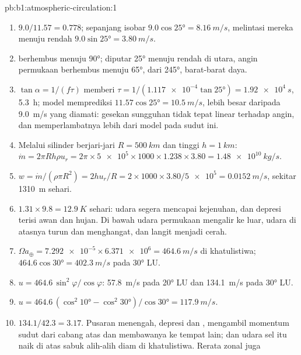 \begin{solution}{pb:b1:atmospheric-circulation:1}
\begin{enumerate}
        keseimbangan tidak punya waktu untuk terbentuk, dan rumusnya tidak berlaku.
  \item $9.0/11.57 = 0.778$; sepanjang isobar $9.0\cos\ang{25} = \qty{8.16}{m/s}$,
        melintasi mereka menuju rendah $9.0\sin\ang{25} = \qty{3.80}{m/s}$.
  \item {} berhembus menuju  \ang{90}; diputar \ang{25} menuju rendah
        di utara, angin permukaan berhembus menuju \ang{65}, dari \ang{245}, barat-barat daya.
  \item $\tan\alpha = 1/(f\tau)$ memberi $\tau = 1/(\num{1.117e-4}\tan\ang{25}) =
        \qty{1.92e4}{s}$, \qty{5.3}{h}; model memprediksi $11.57\cos\ang{25} =
        \qty{10.5}{m/s}$, lebih besar daripada \qty{9.0}{m/s} yang diamati: gesekan sungguhan
        tidak tepat linear terhadap angin, dan memperlambatnya lebih dari model pada sudut ini.
  \item Melalui silinder berjari-jari $R = \qty{500}{km}$ dan tinggi $h =
        \qty{1}{km}$: $\dot m = 2\pi R h\rho u_r = 2\pi \times \num{5e5} \times 1000
        \times 1.238 \times 3.80 = \qty{1.48e10}{kg/s}$.
  \item $w = \dot m/(\rho\pi R^2) = 2hu_r/R = 2 \times 1000 \times 3.80/\num{5e5} =
        \qty{0.0152}{m/s}$, sekitar \qty{1310}{m} sehari.
  \item $1.31 \times 9.8 = \qty{12.9}{K}$ sehari: udara segera mencapai kejenuhan,
        dan depresi terisi awan dan hujan. Di bawah  udara permukaan mengalir
        ke luar, udara di atasnya turun dan menghangat, dan langit menjadi cerah.
  \item $\Omega a_\oplus = \num{7.292e-5} \times \num{6.371e6} = \qty{464.6}{m/s}$
        di khatulistiwa; $464.6\cos\ang{30} = \qty{402.3}{m/s}$ pada \ang{30} LU.
  \item $u = 464.6\,\sin^2\varphi/\cos\varphi$: \qty{57.8}{m/s} pada \ang{20} LU dan
        \qty{134.1}{m/s} pada \ang{30} LU.
  \item $u = 464.6\,(\cos^2\ang{10} - \cos^2\ang{30})/\cos\ang{30} =
        \qty{117.9}{m/s}$.
  \item $134.1/42.3 = 3.17$. Pusaran  menengah, depresi dan ,
        mengambil momentum sudut dari cabang atas dan membawanya ke tempat lain; dan udara
        sel itu naik di atas sabuk  alih-alih diam di khatulistiwa. Rerata zonal juga

\end{enumerate}
\end{solution}
